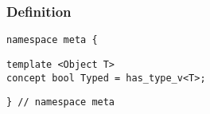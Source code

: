 
\subsubsection{Definition}

\begin{verbatim}
namespace meta {
\end{verbatim}
\begin{verbatim}
template <Object T>
concept bool Typed = has_type_v<T>;

\end{verbatim}
\begin{verbatim}
} // namespace meta
\end{verbatim}
